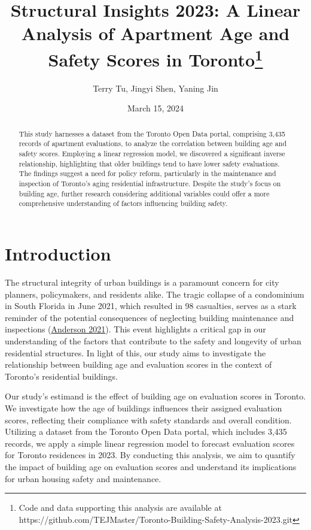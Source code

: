 \documentclass[
  letterpaper,
  DIV=11,
  numbers=noendperiod]{scrartcl}
\title{Structural Insights 2023: A Linear Analysis of Apartment Age and
Safety Scores in Toronto\thanks{Code and data supporting this analysis
are available at
https://github.com/TEJMaster/Toronto-Building-Safety-Analysis-2023.git}}
\author{Terry Tu, Jingyi Shen, Yaning Jin}
\date{March 15, 2024}
\renewcommand*\contentsname{Table of contents}
\newcommand\contentsname{Table of contents}
\begin{document}
\maketitle
\begin{abstract}
This study harnesses a dataset from the Toronto Open Data portal,
comprising 3,435 records of apartment evaluations, to analyze the
correlation between building age and safety scores. Employing a linear
regression model, we discovered a significant inverse relationship,
highlighting that older buildings tend to have lower safety evaluations.
The findings suggest a need for policy reform, particularly in the
maintenance and inspection of Toronto's aging residential
infrastructure. Despite the study's focus on building age, further
research considering additional variables could offer a more
comprehensive understanding of factors influencing building safety.
\end{abstract}
\ifdefined\Shaded\renewenvironment{Shaded}{\begin{tcolorbox}[borderline west={3pt}{0pt}{shadecolor}, sharp corners, interior hidden, breakable, frame hidden, boxrule=0pt, enhanced]}{\end{tcolorbox}}\fi

\renewcommand*\contentsname{Table of contents}
{
\hypersetup{linkcolor=}
\setcounter{tocdepth}{1}
\tableofcontents
}
\hypertarget{introduction}{%
\section{Introduction}\label{introduction}}

The structural integrity of urban buildings is a paramount concern for
city planners, policymakers, and residents alike. The tragic collapse of
a condominium in South Florida in June 2021, which resulted in 98
casualties, serves as a stark reminder of the potential consequences of
neglecting building maintenance and inspections
(\protect\hyperlink{ref-Anderson_2021}{Anderson 2021}). This event
highlights a critical gap in our understanding of the factors that
contribute to the safety and longevity of urban residential structures.
In light of this, our study aims to investigate the relationship between
building age and evaluation scores in the context of Toronto's
residential buildings.

Our study's estimand is the effect of building age on evaluation scores
in Toronto. We investigate how the age of buildings influences their
assigned evaluation scores, reflecting their compliance with safety
standards and overall condition. Utilizing a dataset from the Toronto
Open Data portal, which includes 3,435 records, we apply a simple linear
regression model to forecast evaluation scores for Toronto residences in
2023. By conducting this analysis, we aim to quantify the impact of
building age on evaluation scores and understand its implications for
urban housing safety and maintenance.
\end{document}
